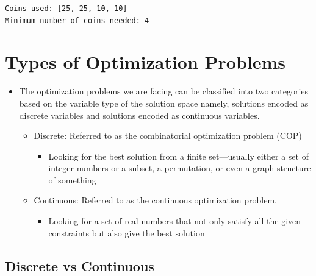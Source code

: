 \documentclass[
  letterpaper,
  DIV=11,
  numbers=noendperiod]{scrreprt}
\providecommand{\tightlist}{%
  \setlength{\itemsep}{0pt}\setlength{\parskip}{0pt}}\usepackage{longtable,booktabs,array}
\begin{document}
\begin{verbatim}
Coins used: [25, 25, 10, 10]
Minimum number of coins needed: 4
\end{verbatim}


\chapter{Types of Optimization
Problems}\label{types-of-optimization-problems}

\begin{itemize}
\tightlist
\item
  The optimization problems we are facing can be classified into two
  categories based on the variable type of the solution space namely,
  solutions encoded as discrete variables and solutions encoded as
  continuous variables.

  \begin{itemize}
  \tightlist
  \item
    Discrete: Referred to as the combinatorial optimization problem
    (COP)

    \begin{itemize}
    \tightlist
    \item
      Looking for the best solution from a finite set---usually either a
      set of integer numbers or a subset, a permutation, or even a graph
      structure of something
    \end{itemize}
  \item
    Continuous: Referred to as the continuous optimization problem.

    \begin{itemize}
    \tightlist
    \item
      Looking for a set of real numbers that not only satisfy all the
      given constraints but also give the best solution
    \end{itemize}
  \end{itemize}
\end{itemize}

\section{Discrete vs Continuous}\label{discrete-vs-continuous}
\end{document}

